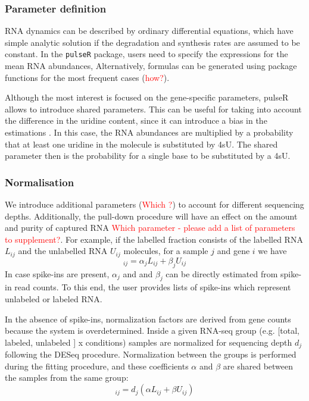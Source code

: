 \subsubsection*{Parameter definition}
RNA dynamics can be described by ordinary differential equations,
which have simple analytic solution 
if the degradation and synthesis rates are assumed to be constant.
In the \verb|pulseR| package,
users need to specify the expressions for the mean RNA abundances,
Alternatively, formulas can be generated using package functions for the 
most frequent cases (\textcolor{red}{how?}). 

Although the most interest is focused on the gene-specific parameters,
pulseR allows to introduce shared parameters.
 This can be useful for taking into account the difference in the uridine content, since
it can introduce a bias in the estimations \citep{miller2011dynamic,
schwalb2012measurement}.
In this case, the RNA abundances are multiplied by 
a probability that at least one uridine in the molecule is substituted by 4sU.
The shared parameter then is the probability for a single base to be substituted
by a 4sU.
\subsubsection*{Normalisation}
We introduce additional parameters (\textcolor{red}{Which ?}) to account for different sequencing depths.
Additionally, the pull-down procedure will have an effect on the amount and purity of captured RNA \textcolor{red}{Which parameter - please add a list of parameters to supplement?}. 
 For example, 
if the labelled fraction consists of the labelled RNA $L_{ij}$ and the unlabelled RNA
 $U_{ij}$ molecules, for a sample $j$ and gene $i$ we have 
\begin{equation}
 [\text{labelled fraction}]_{ij}  = \alpha_{j} L_{ij} + \beta_{j} U_{ij}
\end{equation}
In case spike-ins are present, $\alpha_{j}$ and and $\beta_j$ can be directly estimated from spike-in read counts. 
To this end, the user provides lists of spike-ins which represent unlabeled or labeled RNA.
\par
In the absence of spike-ins, 
normalization factors are derived from gene counts
because the system is overdetermined.
Inside a given RNA-seq group (e.g. [total, labeled, unlabeled ] x conditions) samples are normalized for sequencing depth $d_j$ following the DESeq procedure.
Normalization between the groups is performed during the fitting procedure, 
and these coefficients $\alpha$ and $\beta$ are shared between the samples from the same group:
\begin{equation}
 [\text{labelled fraction}]_{ij}  = d_j(\alpha L_{ij} + \beta U_{ij})
\end{equation}

